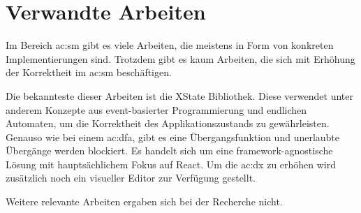 \chapter{Verwandte Arbeiten}

Im Bereich \acrlong{ac:sm} gibt es viele Arbeiten, die meistens in Form von konkreten Implementierungen sind. Trotzdem gibt es kaum Arbeiten, die sich mit Erhöhung der Korrektheit im \acrshort{ac:sm} beschäftigen.

Die bekannteste dieser Arbeiten ist die XState Bibliothek. Diese verwendet unter anderem Konzepte aus event-basierter Programmierung und endlichen Automaten, um die Korrektheit des Applikationszustands zu gewährleisten. Genauso wie bei einem \acrlong{ac:dfa}, gibt es eine Übergangsfunktion und unerlaubte Übergänge werden blockiert. Es handelt sich um eine framework-agnostische Lösung mit hauptsächlichem Fokus auf React. Um die \acrlong{ac:dx} zu erhöhen wird zusätzlich noch ein visueller Editor zur Verfügung gestellt.\cite{xstate}

Weitere relevante Arbeiten ergaben sich bei der Recherche nicht.